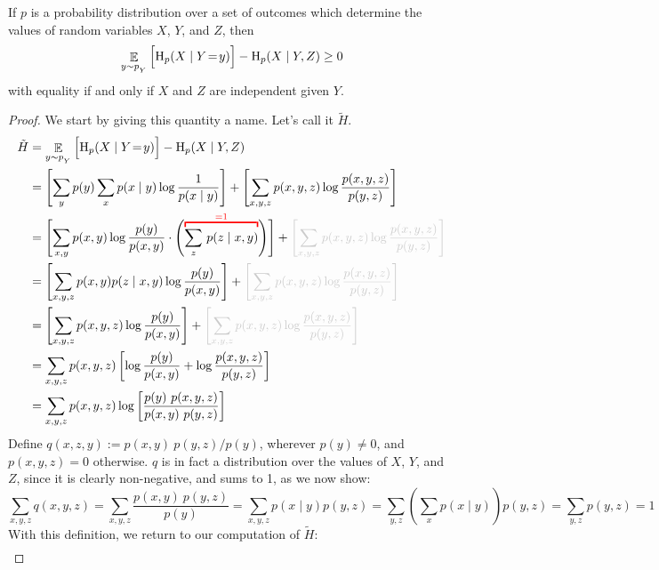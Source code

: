\documentclass{article}
\begin{document}
\begin{lemma} \label{lem:bnmaxent-component}
	If $p$ is a probability distribution over a set of outcomes which determine the values of random variables $X$, $Y$, and $Z$, then 
	\[ \mathop{\mathbb E}_{y \sim p_{_{Y}}} \Big[ \mathrm{H}_p(X \mid Y \!=\!y) \Big]  - \mathrm{H}_p( X \mid Y, Z) \geq 0 \]
	with equality if and only if $X$ and $Z$ are independent given $Y$.
\end{lemma}
\begin{proof}
	We start by giving this quantity a name. Let's call it $\tilde H$.
	\begin{align*}
		\tilde H &= \E_{y \sim p_{_{Y}}}  \Big[ \H_p(X \mid Y \!=\!y)\Big] - \H_p( X \mid Y, Z)  \\
			&=  \left[\sum_{y} p(y) \sum_x  p(x\mid y) \log \frac{1}{p(x \mid y)} \right]+ \left[\sum_{x,y, z} p(x, y, z) \log \frac{p(x,y,z)}{p(y, z)}\right] \\[0.5em]
		&= \left[\sum_{x,y} p(x,y) \log \frac{p(y)}{p(x,y)} \cdot 
				\left( {\color{red} \vphantom{\sum_{z}}\smash{\overbracket{\color{black}{\sum_{z}}~p(z \mid x, y)}^{=1}}}\right)
			\right] + {\color{inactive}\left[\sum_{x,y, z} p(x, y, z) \log \frac{p(x,y,z)}{p(y, z)} \right]} \\
		&= \left[\sum_{x,y, z} p(x,y) p(z \mid x, y) \log \frac{p(y)}{p(x,y)} \right] + {\color{inactive}\left[\sum_{x,y, z} p(x, y, z) \log \frac{p(x,y,z)}{p(y, z)} \right]} \\
		&= \left[\sum_{x,y, z} p(x,y ,z) \log \frac{p(y)}{p(x,y)}
			\right] + {\color{inactive}\left[\sum_{x,y, z} p(x, y, z) \log \frac{p(x,y,z)}{p(y, z)} \right]} \\
		&= \sum_{x,y, z} p(x,y ,z) \left[ \log \frac{p(y)}{p(x,y)} + \log \frac{p(x,y,z)}{p(y, z)} \right] \\
		&= \sum_{x,y, z}  p(x,y ,z) \log \left[\frac{p(y)\ p(x,y,z)}{p(x,y)\ p(y,z)} \right]  \\
	\end{align*}
	Define $q(x,z,y) := {p(x,y)\ p(y,z) }/{p(y)}$, wherever $p(y)\neq 0$, and $p(x,y,z) = 0$ otherwise. $q$ is in fact a distribution over the values of $X$, $Y$, and $Z$, since it 
	is clearly non-negative, and sums to 1, as we now show:
	\[
	 \sum_{x,y,z} q(x,y, z) = \sum_{x,y,z} \frac{p(x,y)\ p(y,z)}{p(y)}
		= \sum_{x,y,z} p(x \mid y) p(y,z)
		= \sum_{y,z} \left(\sum_x p(x \mid y)\right) p(y,z)
		= \sum_{y,z}  p(y,z)
		= 1
	\]	
		With this definition, we return to our computation of $\tilde H$:
	\begin{align*}

\end{align*}
\end{proof}
\end{document}
